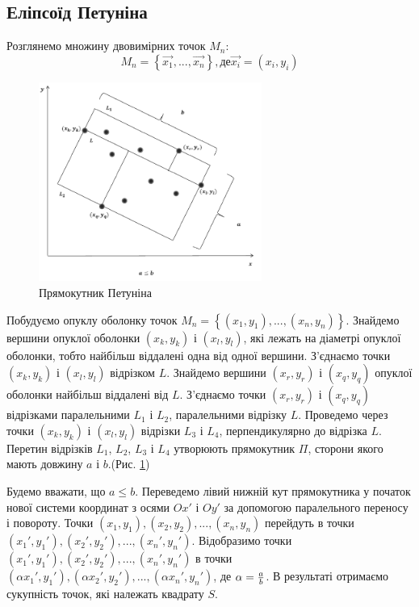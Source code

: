 \documentclass[14pt,a4paper,titlepage]{extarticle}
\begin{document}
\subsection{Еліпсоїд Петуніна}
Розглянемо множину двовимірних точок $M_n$:
\[M_n = \left\{\overrightarrow{x_1},...,\overrightarrow{x_n}\right\},
де \overrightarrow{x_i} = (x_i, y_i)\]

\begin{figure}[h!]
\centering
\includegraphics[width=0.65\textwidth]{pet1}
\caption{Прямокутник Петуніна}
\label{fig:pet1}
\end{figure}

Побудуємо опуклу оболонку точок $M_n = \left\{(x_1,y_1),...,(x_n,y_n)\right\}$.
Знайдемо вершини опуклої оболонки $(x_k,y_k)$ і $(x_l,y_l)$,
які лежать на діаметрі опуклої оболонки,
тобто найбільш віддалені одна від одної вершини.
З’єднаємо точки $(x_k,y_k)$ і $(x_l,y_l)$ відрізком $L$.
Знайдемо вершини $(x_r,y_r)$ і $(x_q,y_q)$ опуклої оболонки
найбільш віддалені від $L$.
З’єднаємо точки $(x_r,y_r)$ і $(x_q,y_q)$ відрізками паралельними
$L_1$ і $L_2$, паралельними відрізку $L$.
Проведемо через точки $(x_k,y_k)$ і $(x_l,y_l)$ відрізки $L_3$ і $L_4$,
перпендикулярно до відрізка $L$. Перетин відрізків $L_1$, $L_2$, $L_3$ і $L_4$
утворюють прямокутник $\Pi$, сторони якого мають довжину $a$ і $b$.(Рис.
\ref{fig:pet1})
\par

Будемо вважати, що $a \leq b$. Переведемо лівий нижній кут прямокутника у
початок нової системи координат з осями $Ox'$ і $Oy'$ за допомогою паралельного
переносу і повороту. Точки $(x_1,y_1), (x_2,y_2),...,(x_n,y_n)$ перейдуть в
точки$(x_1',y_1'), (x_2',y_2'),...,(x_n',y_n')$. Відобразимо точки
$(x_1',y_1'), (x_2',y_2'),...,(x_n',y_n')$ в точки $(\alpha x_1',y_1'), (\alpha
x_2',y_2'),...,(\alpha x_n',y_n')$, де $\alpha = {a\over{b}}$. В результаті
отримаємо сукупність точок, які належать квадрату $S$. \par
\end{document}
